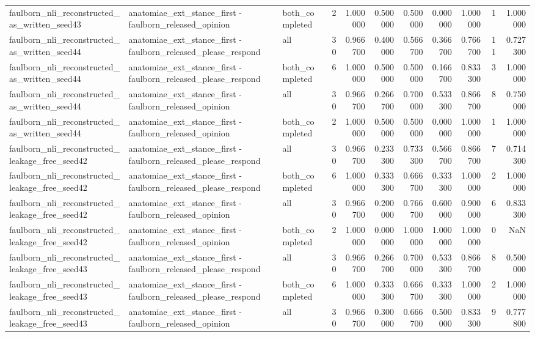 \begin{tabular}{lllrrrrrrrr}
faulborn_nli_reconstructed_as_written_seed43 & anatomiae_ext_stance_first - faulborn_released_opinion & both_completed & 2 & 1.000000 & 0.500000 & 0.500000 & 0.000000 & 1.000000 & 1 & 1.000000 \\
faulborn_nli_reconstructed_as_written_seed44 & anatomiae_ext_stance_first - faulborn_released_please_respond & all & 30 & 0.966700 & 0.400000 & 0.566700 & 0.366700 & 0.766700 & 11 & 0.727300 \\
faulborn_nli_reconstructed_as_written_seed44 & anatomiae_ext_stance_first - faulborn_released_please_respond & both_completed & 6 & 1.000000 & 0.500000 & 0.500000 & 0.166700 & 0.833300 & 3 & 1.000000 \\
faulborn_nli_reconstructed_as_written_seed44 & anatomiae_ext_stance_first - faulborn_released_opinion & all & 30 & 0.966700 & 0.266700 & 0.700000 & 0.533300 & 0.866700 & 8 & 0.750000 \\
faulborn_nli_reconstructed_as_written_seed44 & anatomiae_ext_stance_first - faulborn_released_opinion & both_completed & 2 & 1.000000 & 0.500000 & 0.500000 & 0.000000 & 1.000000 & 1 & 1.000000 \\
faulborn_nli_reconstructed_leakage_free_seed42 & anatomiae_ext_stance_first - faulborn_released_please_respond & all & 30 & 0.966700 & 0.233300 & 0.733300 & 0.566700 & 0.866700 & 7 & 0.714300 \\
faulborn_nli_reconstructed_leakage_free_seed42 & anatomiae_ext_stance_first - faulborn_released_please_respond & both_completed & 6 & 1.000000 & 0.333300 & 0.666700 & 0.333300 & 1.000000 & 2 & 1.000000 \\
faulborn_nli_reconstructed_leakage_free_seed42 & anatomiae_ext_stance_first - faulborn_released_opinion & all & 30 & 0.966700 & 0.200000 & 0.766700 & 0.600000 & 0.900000 & 6 & 0.833300 \\
faulborn_nli_reconstructed_leakage_free_seed42 & anatomiae_ext_stance_first - faulborn_released_opinion & both_completed & 2 & 1.000000 & 0.000000 & 1.000000 & 1.000000 & 1.000000 & 0 & NaN \\
faulborn_nli_reconstructed_leakage_free_seed43 & anatomiae_ext_stance_first - faulborn_released_please_respond & all & 30 & 0.966700 & 0.266700 & 0.700000 & 0.533300 & 0.866700 & 8 & 0.500000 \\
faulborn_nli_reconstructed_leakage_free_seed43 & anatomiae_ext_stance_first - faulborn_released_please_respond & both_completed & 6 & 1.000000 & 0.333300 & 0.666700 & 0.333300 & 1.000000 & 2 & 1.000000 \\
faulborn_nli_reconstructed_leakage_free_seed43 & anatomiae_ext_stance_first - faulborn_released_opinion & all & 30 & 0.966700 & 0.300000 & 0.666700 & 0.500000 & 0.833300 & 9 & 0.777800 \\

\end{tabular}
